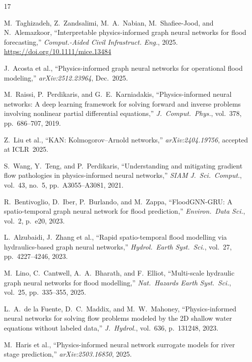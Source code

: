 \documentclass[conference]{IEEEtran}
\begin{document}

\begin{thebibliography}{17}

M.~Taghizadeh, Z.~Zandsalimi, M.~A.~Nabian, M.~Shafiee-Jood, and
N.~Alemazkoor, ``Interpretable physics-informed graph neural networks for
flood forecasting,'' \textit{Comput.-Aided Civil Infrastruct. Eng.},
2025. \url{https://doi.org/10.1111/mice.13484}

J.~Acosta et al., ``Physics-informed graph neural networks for operational
flood modeling,'' \textit{arXiv:2512.23964}, Dec.\ 2025.

M.~Raissi, P.~Perdikaris, and G.~E.~Karniadakis, ``Physics-informed neural
networks: A deep learning framework for solving forward and inverse problems
involving nonlinear partial differential equations,''
\textit{J.\ Comput.\ Phys.}, vol.~378, pp.~686--707, 2019.

Z.~Liu et al., ``KAN: Kolmogorov--Arnold networks,''
\textit{arXiv:2404.19756}, accepted at ICLR~2025.

S.~Wang, Y.~Teng, and P.~Perdikaris, ``Understanding and mitigating
gradient flow pathologies in physics-informed neural networks,''
\textit{SIAM J.\ Sci.\ Comput.}, vol.~43, no.~5, pp.~A3055--A3081, 2021.

R.~Bentivoglio, D.~Iber, P.~Burlando, and M.~Zappa, ``FloodGNN-GRU:
A spatio-temporal graph neural network for flood prediction,''
\textit{Environ.\ Data Sci.}, vol.~2, p.~e20, 2023.

L.~Alzubaidi, J.~Zhang et al., ``Rapid spatio-temporal flood modelling via
hydraulics-based graph neural networks,''
\textit{Hydrol.\ Earth Syst.\ Sci.}, vol.~27, pp.~4227--4246, 2023.

M.~Lino, C.~Cantwell, A.~A.~Bharath, and F.~Elliot, ``Multi-scale
hydraulic graph neural networks for flood modelling,''
\textit{Nat.\ Hazards Earth Syst.\ Sci.}, vol.~25, pp.~335--355, 2025.

L.~A.~de la Fuente, D.~C.~Maddix, and M.~W.~Mahoney, ``Physics-informed
neural networks for solving flow problems modeled by the 2D shallow water
equations without labeled data,'' \textit{J.\ Hydrol.}, vol.~636,
p.~131248, 2023.

M.~Haris et al., ``Physics-informed neural network surrogate models for
river stage prediction,'' \textit{arXiv:2503.16850}, 2025.


\end{thebibliography}
\end{document}
